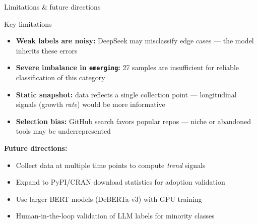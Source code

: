 \begin{frame}{Limitations \& future directions}

  \begin{redbox}{Key limitations}
    \begin{itemize}
      \item \textbf{Weak labels are noisy:} DeepSeek may misclassify edge cases —
            the model inherits these errors
      \item \textbf{Severe imbalance in \texttt{emerging}:} 27 samples are insufficient
            for reliable classification of this category
      \item \textbf{Static snapshot:} data reflects a single collection point —
            longitudinal signals (growth \textit{rate}) would be more informative
      \item \textbf{Selection bias:} GitHub search favors popular repos —
            niche or abandoned tools may be underrepresented
    \end{itemize}
  \end{redbox}

  \bigskip
  \textbf{Future directions:}
  \begin{itemize}
    \item Collect data at multiple time points to compute \textit{trend} signals
    \item Expand to PyPI/CRAN download statistics for adoption validation
    \item Use larger BERT models (DeBERTa-v3) with GPU training
    \item Human-in-the-loop validation of LLM labels for minority classes
  \end{itemize}

\end{frame}


